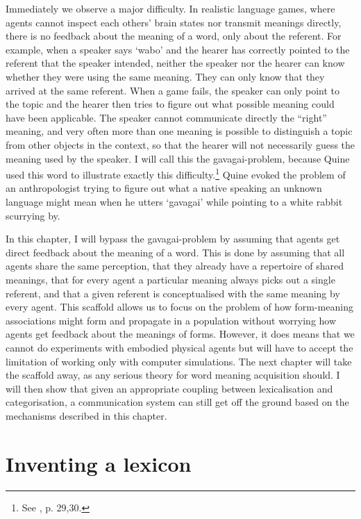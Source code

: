 Immediately we observe a major difficulty. In realistic
language games, where agents cannot inspect each others' 
brain states nor transmit meanings directly, 
there is no feedback about the 
meaning of a word, only about the referent. For example, 
when a speaker says `wabo' and the hearer has correctly pointed 
to the referent that the speaker intended, neither the 
speaker nor the hearer can know whether they were 
using the same meaning. They can only know that they 
arrived at the same referent. When a game fails, the speaker 
can only point to the topic and the hearer then 
tries to figure out what possible meaning 
could have been applicable. The speaker cannot
communicate directly the ``right'' meaning, and very often more 
than one meaning is possible to distinguish a topic from 
other objects in the context, so that the hearer will 
not necessarily guess the meaning used by the speaker. 
I will call this the gavagai-problem, because Quine 
used this word to illustrate exactly this difficulty.\footnote{See \cite{Quine:1960}, p. 29,30.}
Quine evoked the problem of an anthropologist
trying to figure out what a native speaking an unknown
language might mean when he utters `gavagai' while pointing
to a white rabbit scurrying by. 

In this chapter, I will bypass the gavagai-problem by assuming
that agents get direct feedback about the meaning of a word. 
This is done by assuming that all agents share the 
same perception, that they already have
a repertoire of shared meanings, that for every agent
a particular meaning always picks out a single referent, and 
that a given referent is conceptualised with the same meaning 
by every agent. This scaffold allows us to focus on the problem
of how form-meaning associations might form and propagate in
a population without worrying how agents get feedback about 
the meanings of forms. However, it does means that we cannot 
do experiments with embodied physical agents but will have
to accept the limitation of working only
with computer simulations. 
The next chapter will take the scaffold 
away, as any serious theory for word meaning 
acquisition should. I will then show that given an 
appropriate coupling between lexicalisation and categorisation, 
a communication system can still get off the ground based on 
the mechanisms described in this chapter. 

\section{Inventing a lexicon}

